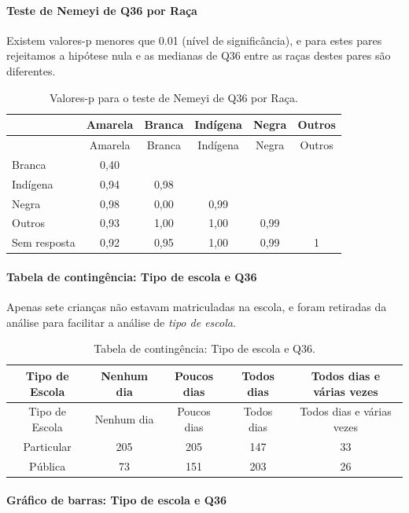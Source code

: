 \documentclass[]{article}
\let\oldparagraph\paragraph
\renewcommand{\paragraph}[1]{\oldparagraph{#1}\mbox{}}
\begin{document}
\hypertarget{teste-de-nemeyi-de-q36-por-rauxe7a}{%
\paragraph{Teste de Nemeyi de Q36 por Raça}\label{teste-de-nemeyi-de-q36-por-rauxe7a}}

Existem valores-p menores que 0.01 (nível de significância), e para estes pares rejeitamos a hipótese nula e as medianas de Q36 entre as raças destes pares são diferentes.

\begin{longtable}[]{@{}lccccc@{}}
\caption{\label{tab:unnamed-chunk-1349}Valores-p para o teste de Nemeyi de Q36 por Raça.}\tabularnewline
\toprule
& Amarela & Branca & Indígena & Negra & Outros\tabularnewline
\midrule
\endfirsthead
\toprule
& Amarela & Branca & Indígena & Negra & Outros\tabularnewline
\midrule
\endhead
Branca & 0,40 & & & &\tabularnewline
Indígena & 0,94 & 0,98 & & &\tabularnewline
Negra & 0,98 & 0,00 & 0,99 & &\tabularnewline
Outros & 0,93 & 1,00 & 1,00 & 0,99 &\tabularnewline
Sem resposta & 0,92 & 0,95 & 1,00 & 0,99 & 1\tabularnewline
\bottomrule
\end{longtable}

\cleardoublepage

\hypertarget{tabela-de-continguxeancia-tipo-de-escola-e-q36}{%
\paragraph{Tabela de contingência: Tipo de escola e Q36}\label{tabela-de-continguxeancia-tipo-de-escola-e-q36}}

Apenas sete crianças não estavam matriculadas na escola, e foram retiradas da análise para facilitar a análise de \emph{tipo de escola}.

\begin{longtable}[]{@{}ccccc@{}}
\caption{\label{tab:unnamed-chunk-1350}Tabela de contingência: Tipo de escola e Q36.}\tabularnewline
\toprule
Tipo de Escola & Nenhum dia & Poucos dias & Todos dias & Todos dias e várias vezes\tabularnewline
\midrule
\endfirsthead
\toprule
Tipo de Escola & Nenhum dia & Poucos dias & Todos dias & Todos dias e várias vezes\tabularnewline
\midrule
\endhead
Particular & 205 & 205 & 147 & 33\tabularnewline
Pública & 73 & 151 & 203 & 26\tabularnewline
\bottomrule
\end{longtable}

\hypertarget{gruxe1fico-de-barras-tipo-de-escola-e-q36}{%
\paragraph{Gráfico de barras: Tipo de escola e Q36}\label{gruxe1fico-de-barras-tipo-de-escola-e-q36}}
\end{document}
